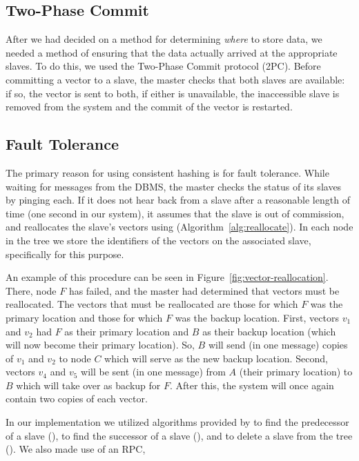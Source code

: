 \subsection{Two-Phase Commit}
After we had decided on a method for determining \emph{where} to store data,
we needed a method of ensuring that the data actually arrived at the
appropriate slaves. To do this, we used the Two-Phase Commit protocol (2PC).
Before committing a vector to a slave, the master checks that both slaves are
available: if so, the vector is sent to both, if either is unavailable, the
inaccessible slave is removed from the system and the commit of the vector is
restarted. \cite{tanenbaum2017}
%
\subsection{Fault Tolerance}
The primary reason for using consistent hashing is for fault tolerance. While
waiting for messages from the DBMS, the master checks the status of its slaves
by pinging each. If it does not hear back from a slave after a
reasonable length of time (one second in our system), it assumes that the slave
is out of commission, and reallocates the slave's vectors using 
(Algorithm~\ref{alg:reallocate}). In each node in the tree we store the
identifiers of the vectors on the associated slave, specifically for this
purpose.
\par
An example of this procedure can be seen in Figure~\ref{fig:vector-reallocation}. There,
node \(F\) has failed, and the master had determined that vectors must be
reallocated. The vectors that must be reallocated are those for which \(F\) was
the primary location and those for which \(F\) was the backup location. First,
vectors \(v_1\) and \(v_2\) had \(F\) as their primary location and \(B\) as
their backup location (which will now become their primary location). So, \(B\)
will send (in one message) copies of \(v_1\) and \(v_2\) to node \(C\) which
will serve as the new backup location. Second, vectors \(v_4\) and \(v_5\) will
be sent (in one message) from \(A\) (their primary location) to \(B\) which
will take over as backup for \(F\). After this, the system will once again
contain two copies of each vector.
\par
%
In our implementation we utilized algorithms provided by \cite{cormen2009}
to find the predecessor of a slave (), to find the
successor of a slave (), and to delete a slave from the
tree (). We also made use of an RPC,
